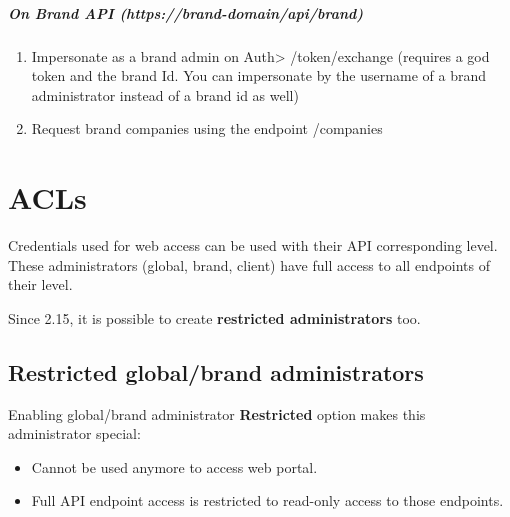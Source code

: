 \documentclass[letterpaper,10pt,spanish]{sphinxmanual}
\begin{document}
\paragraph{On Brand API (https://brand-domain/api/brand)}
\begin{enumerate}
\item {} 
Impersonate as a brand admin on Auth\textgreater{} /token/exchange (requires a god token and the brand Id. You can impersonate by the username of a brand administrator instead of a brand id as well)

\item {} 
Request brand companies using the endpoint /companies

\end{enumerate}


\chapter{ACLs}
\label{api_rest/acls:acls}\label{api_rest/acls::doc}\label{api_rest/acls:id1}
Credentials used for web access can be used with their API corresponding level. These administrators (global, brand, client)
have full access to all endpoints of their level.

Since 2.15, it is possible to create \textbf{restricted administrators} too.


\section{Restricted global/brand administrators}
\label{api_rest/acls:restricted-global-brand-administrators}
Enabling global/brand administrator \textbf{Restricted} option makes this administrator special:
\begin{itemize}
\item {} 
Cannot be used anymore to access web portal.

\item {} 
Full API endpoint access is restricted to read-only access to those endpoints.

\end{itemize}
\end{document}
